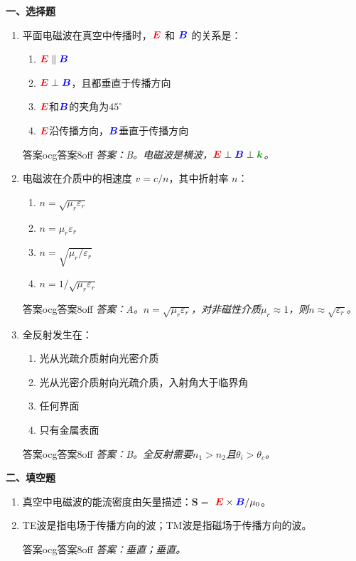 \documentclass[11pt,a4paper,openany,oneside]{book}
\newcommand{\vecE}{\textcolor{red}{\vect{E}}}
\newcommand{\vecB}{\textcolor{blue}{\vect{B}}}
\newcommand{\vecK}{\textcolor{green!60!black}{\vect{k}}}
\newcommand{\eps}{\varepsilon}
\newcommand{\muz}{\mu_0}
\newcommand{\vect}[1]{\bm{#1}}
\begin{document}
\begin{miniquiz}
\textbf{一、选择题}
\begin{enumerate}[label=\arabic*.]
\item 平面电磁波在真空中传播时，$\vecE$ 和 $\vecB$ 的关系是：
  \begin{enumerate}[label=(\Alph*),nosep]
  \item $\vecE \parallel \vecB$
  \item $\vecE \perp \vecB$，且都垂直于传播方向
  \item $\vecE$和$\vecB$的夹角为$45^\circ$
  \item $\vecE$沿传播方向，$\vecB$垂直于传播方向
  \end{enumerate}
\begin{ocg}{答案}{ocg答案8}{off}
  \textit{答案：B。电磁波是横波，$\vecE\perp\vecB\perp\vecK$。}
\end{ocg}

\item 电磁波在介质中的相速度 $v = c/n$，其中折射率 $n$：
  \begin{enumerate}[label=(\Alph*),nosep]
  \item $n = \sqrt{\mu_r\eps_r}$
  \item $n = \mu_r\eps_r$
  \item $n = \sqrt{\mu_r/\eps_r}$
  \item $n = 1/\sqrt{\mu_r\eps_r}$
  \end{enumerate}
\begin{ocg}{答案}{ocg答案8}{off}
  \textit{答案：A。$n=\sqrt{\mu_r\eps_r}$，对非磁性介质$\mu_r\approx 1$，则$n\approx\sqrt{\eps_r}$。}
\end{ocg}

\item 全反射发生在：
  \begin{enumerate}[label=(\Alph*),nosep]
  \item 光从光疏介质射向光密介质
  \item 光从光密介质射向光疏介质，入射角大于临界角
  \item 任何界面
  \item 只有金属表面
  \end{enumerate}
\begin{ocg}{答案}{ocg答案8}{off}
  \textit{答案：B。全反射需要$n_1>n_2$且$\theta_i>\theta_c$。}
\end{ocg}
\end{enumerate}

\vspace{0.5em}
\textbf{二、填空题}
\begin{enumerate}[label=\arabic*.,resume]
\item 真空中电磁波的能流密度由\underline{\hspace{2cm}}矢量描述：$\vect{S} = $ \underline{$\vecE\times\vecB/\muz$}。
\item TE波是指电场\underline{\hspace{2cm}}于传播方向的波；TM波是指磁场\underline{\hspace{2cm}}于传播方向的波。
\begin{ocg}{答案}{ocg答案8}{off}
  \textit{答案：垂直；垂直。}
\end{ocg}
\end{enumerate}
\end{miniquiz}
\end{document}
